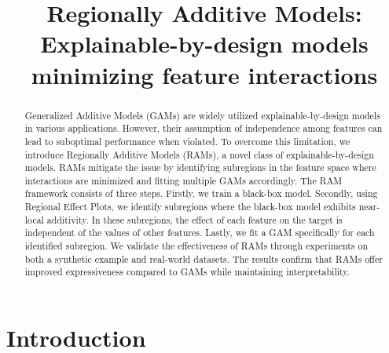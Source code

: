\documentclass[runningheads]{llncs}
\begin{document}
%
\title{Regionally Additive Models: Explainable-by-design models minimizing feature interactions}
%
%
\author{
}
%
%
\institute{
}
%
\maketitle              %
%
\begin{abstract}
Generalized Additive Models (GAMs) are widely utilized explainable-by-design models in various applications.
However, their assumption of independence among features can lead to suboptimal performance when violated.
To overcome this limitation, we introduce Regionally Additive Models (RAMs), a novel class of explainable-by-design models.
RAMs mitigate the issue by identifying subregions in the feature space where interactions are minimized and fitting multiple GAMs accordingly.
The RAM framework consists of three steps.
Firstly, we train a black-box model.
Secondly, using Regional Effect Plots, we identify subregions where the black-box model exhibits near-local additivity.
In these subregions, the effect of each feature on the target is independent of the values of other features.
Lastly, we fit a GAM specifically for each identified subregion.
We validate the effectiveness of RAMs through experiments on both a synthetic example and real-world datasets.
The results confirm that RAMs offer improved expressiveness compared to GAMs while maintaining interpretability.
\end{abstract}
%
%
%
\section{Introduction}
\end{document}
